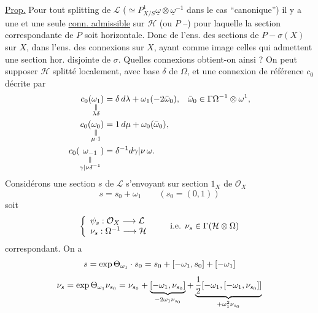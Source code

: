 \uline{Prop.} Pour tout splitting de  $\mathcal{L}$ ($\simeq P^1_{X/S}\underline{\omega}\otimes\underline{\omega}^{-1}$ dans le cas ``canonique'') il y a une et une seule \uline{conn. admissible} sur $\mathcal{H}$ (ou $P$ --) pour laquelle la section correspondante de $P$ soit horizontale. Donc    de l'ens. des sections de $P-\sigma(X)$ sur $X$,  dans l'ens. des connexions  sur $X$, ayant comme image celles qui admettent une section hor. disjointe de $\sigma$.
Quelles connexions  obtient-on ainsi ?
On peut supposer $\mathcal{H}$ splitté localement, avec base $\delta$ de $\Omega$, et une connexion de référence $c_0$ décrite par
\[
\begin{aligned}
c_0(\underset{\substack{\Vert\\\lambda\delta}}{\omega_1})&=\delta\,d\lambda+\omega_1(-2\bar\omega_0),&\bar\omega_0&\in\Gamma\Omega^{-1}\otimes\omega^{{1}},\\
c_0(\underset{\substack{\Vert\\\mu\cdot1}}{\omega_0})&=1\,d\mu+\omega_0(\bar\omega_0),\\
c_0(\underset{\substack{\Vert\\{\gamma|\nu}\delta^{-1}}}{\omega_{-1}})&=\delta^{-1}d{\gamma|\nu}\,{{\omega}}.
\end{aligned}
\]
Considérons une section $s$ de $\mathcal{L}$ s'envoyant sur section $1_X$ de $\mathcal{O}_X$
\[
s=s_0+\omega_1\qquad(s_0=(0,1))
\]
soit
\[
\left\{\begin{array}{l}
{{\psi_s}:\mathcal{O}_X\longrightarrow\mathcal{L}}\\
\nu_s:\Omega^{-1}\longrightarrow\mathcal{H}
\end{array}\right.
\qquad\text{i.e. }\nu_s\in\Gamma(\mathcal{H}\otimes\Omega)
\]
 correspondant.  On a
\[
{s=\exp\Theta_{\omega_1}\cdot s_0=s_0+[-\omega_1,s_0]+{[-\omega_1]}}
\]
\[
\nu_s=\exp\Theta_{\omega_1}\nu_{s_0}
=\nu_{s_0}+\underbrace{[-\omega_1,\nu_{s_0}]}_{{-2\omega_1\nu_{s_0}}}
+\underbrace{\frac12[-\omega_1,[-\omega_1,\nu_{s_0}]]}_{{+\omega_1^2\nu_{s_0}}}
\]
